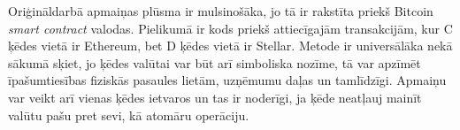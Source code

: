 Oriģināldarbā apmaiņas plūsma ir mulsinošāka, jo tā ir rakstīta priekš Bitcoin \textit{smart contract} valodas. Pielikumā ir kods priekš attiecīgajām transakcijām, kur C ķēdes vietā ir Ethereum, bet D ķēdes vietā ir Stellar.
Metode ir universālāka nekā sākumā sķiet, jo ķēdes valūtai var būt arī simboliska nozīme, tā var apzīmēt īpašumtiesības fiziskās pasaules lietām, uzņēmumu daļas un tamlīdzīgi.\cite{rosenfeld12}
Apmaiņu var veikt arī vienas ķēdes ietvaros un tas ir noderīgi, ja ķēde neatļauj mainīt valūtu pašu pret sevi, kā atomāru operāciju.

